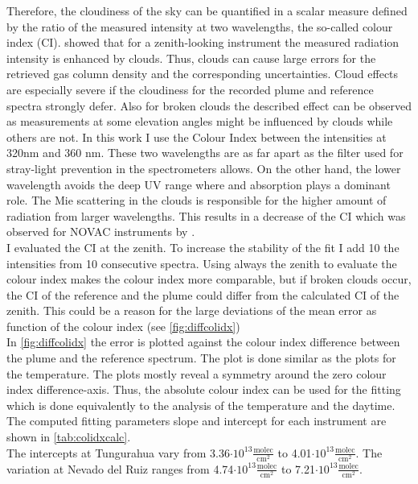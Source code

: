 Therefore, the cloudiness of the sky can be quantified in a scalar measure defined by the ratio of the measured intensity at two wavelengths, the so-called colour index (CI).
\cite{wagner2014cloud} showed that for a zenith-looking instrument the measured radiation intensity is enhanced by clouds. Thus, clouds can cause large errors for the retrieved gas column density and the corresponding uncertainties. 
Cloud effects are especially severe if the cloudiness for the recorded plume and reference spectra strongly defer. Also for broken clouds the described effect can be observed as measurements at some elevation angles might be influenced by clouds while others are not.
In this work I use the Colour Index between the intensities at 320nm and 360 nm.
These two wavelengths are as far apart as the filter used for stray-light prevention in the spectrometers allows.
On the other hand, the lower wavelength avoids the deep UV range where  and   absorption plays a dominant role.
The Mie scattering in the clouds is responsible for the higher amount of radiation from larger wavelengths. This results in a decrease of the CI which was observed for NOVAC instruments by \citet{lubcke2014optical}.\\
I evaluated the CI at the zenith. To increase the stability of the fit I add 10 the intensities from 10 consecutive spectra. Using always the zenith to evaluate the colour index makes the colour index more comparable, but if broken clouds occur, the CI of the reference and the plume could differ from the calculated CI of the zenith. This could be a reason for the large deviations of the mean  error as function of the colour index (see \cref{fig:diffcolidx})\\
In \cref{fig:diffcolidx} the  error is plotted against the colour index difference between the plume and the reference spectrum. The plot is done similar as the plots for the temperature.
The plots mostly reveal a symmetry around the zero colour index difference-axis. Thus, the absolute colour index can be used for the fitting which is done equivalently to the analysis of the temperature and the daytime. The computed fitting parameters slope and intercept for each instrument are shown in \cref{tab:colidxcalc}. \\
The intercepts at Tungurahua vary from 3.36$\cdot10^{13}\frac{\text{molec}}{\text{cm}^2}$ to 4.01$\cdot10^{13}\frac{\text{molec}}{\text{cm}^2}$. The variation at Nevado del Ruiz ranges from  4.74$\cdot10^{13}\frac{\text{molec}}{\text{cm}^2}$ to 7.21$\cdot10^{13}\frac{\text{molec}}{\text{cm}^2}$.\\

